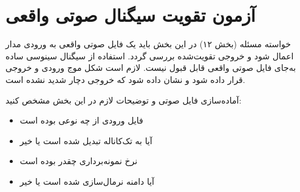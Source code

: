 \documentclass[12pt,a4paper]{article}
\begin{document}
\newpage

\section{آزمون تقویت سیگنال صوتی واقعی}

\begin{taskbox}{خواسته مسئله (بخش ۱۲)}
در این بخش باید یک فایل صوتی واقعی به ورودی مدار اعمال شود و خروجی تقویت‌شده بررسی گردد. استفاده از سیگنال سینوسی ساده به‌جای فایل صوتی واقعی قابل قبول نیست. لازم است شکل موج ورودی و خروجی قرار داده شود و نشان داده شود که خروجی دچار  شدید نشده است.
\end{taskbox}

\begin{calcbox}{آماده‌سازی فایل صوتی و توضیحات لازم}
در این بخش مشخص کنید:
\begin{itemize}
    \item فایل ورودی از چه نوعی بوده است
    \item آیا به تک‌کاناله تبدیل شده است یا خیر
    \item نرخ نمونه‌برداری چقدر بوده است
    \item آیا دامنه نرمال‌سازی شده است یا خیر
\end{itemize}


\vspace{2cm}
\end{calcbox}
\end{document}
